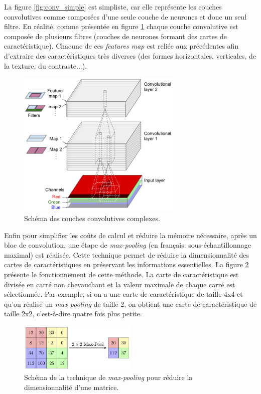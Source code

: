 La figure \ref{fig:conv_simple} est simpliste, car elle représente les couches convolutives comme composées d'une seule couche de neurones et donc un seul filtre. En réalité, comme présentée en figure \ref{fig:conv_complex} chaque couche convolutive est composée de plusieurs filtres (couches de neurones formant des cartes de caractéristique). Chacune de ces \textit{features map} est reliée aux précédentes afin d'extraire des caractéristiques très diverses (des formes horizontales, verticales, de la texture, du contraste...).
\begin{figure}[!ht]
 \centering
 \includegraphics[width=0.7\textwidth]{figures/conv_complex.png}
 \caption[Schéma des couches convolutives]{Schéma des couches convolutives complexes.}
 \label{fig:conv_complex}
\end{figure}


Enfin pour simplifier les coûts de calcul et réduire la mémoire nécessaire, après un bloc de convolution, une étape de \textit{max-pooling }(en français: sous-échantillonnage maximal) est réalisée. Cette technique permet de réduire la dimensionnalité des cartes de caractéristiques en préservant les informations essentielles. La figure \ref{fig:max-pool} présente le fonctionnement de cette méthode. La carte de caractéristique est divisée en carré non chevauchant et la valeur maximale de chaque carré est sélectionnée. Par exemple, si on a une carte de caractéristique de taille 4x4 et qu'on réalise un \textit{max pooling} de taille 2, on obtient une carte de caractéristique de taille 2x2, c'est-à-dire quatre fois plus petite.
\begin{figure}[!ht]
 \centering
 \includegraphics[width=0.5\textwidth]{figures/max-pool.png}
 \caption[Technique de max-pooling]{Schéma de la technique de \textit{max-pooling} pour réduire la dimensionnalité d'une matrice.}
 \label{fig:max-pool}
\end{figure}



